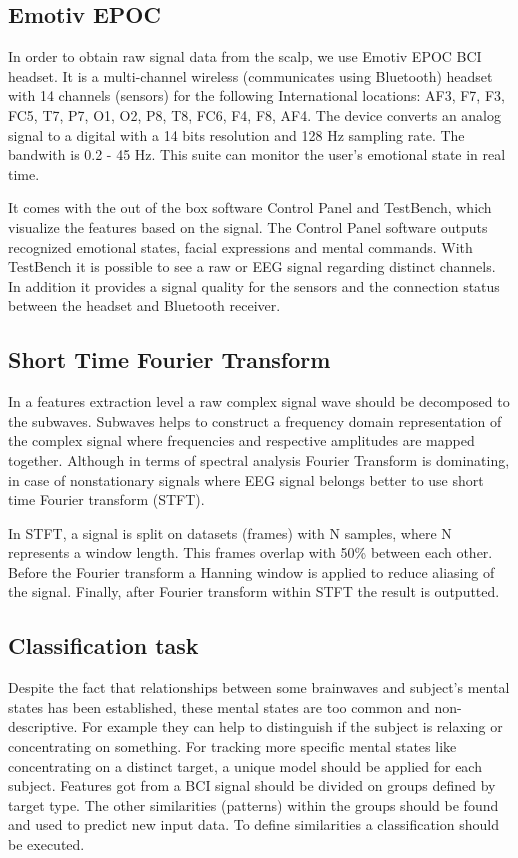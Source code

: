 \documentclass[12pt]{article}
\begin{document}
\subsection{Emotiv EPOC}

In order to obtain raw signal data from the scalp, we use Emotiv EPOC BCI headset. It is a multi-channel wireless (communicates using Bluetooth) headset with 14 channels (sensors) for the following International locations: AF3, F7, F3, FC5, T7, P7, O1, O2, P8, T8, FC6, F4, F8, AF4. The device converts an analog signal to a digital with a 14 bits resolution and 128 Hz sampling rate. The bandwith is 0.2 - 45 Hz. This suite can monitor the user's emotional state in real time.\cite{emotiv}

It comes with the out of the box software Control Panel and TestBench, which visualize the features based on the signal. The Control Panel software outputs recognized emotional states, facial expressions and mental commands. With TestBench it is possible to see a raw or EEG signal regarding distinct channels. In addition it provides a signal quality for the sensors and the connection status between the headset and Bluetooth receiver.
\subsection{Short Time Fourier Transform}

In a features extraction level a raw complex signal wave should be decomposed to the subwaves. Subwaves helps to construct a frequency domain representation of the complex signal where frequencies and respective amplitudes are mapped together. Although in terms of spectral analysis Fourier Transform is dominating, in case of nonstationary signals where EEG signal belongs better to use short time Fourier transform (STFT).\cite{alfahoum_fft}

In STFT, a signal is split on datasets (frames) with N samples, where N represents a window length. This frames overlap with 50\% between each other. Before the Fourier transform a Hanning window is applied to reduce aliasing of the signal. Finally, after Fourier transform within STFT the result is outputted.

\subsection{Classification task}

Despite the fact that relationships between some brainwaves and subject's mental states has been established, these mental states are too common and non-descriptive. For example they can help to distinguish if the subject is relaxing or concentrating on something. For tracking more specific mental states like concentrating on a distinct target, a unique model should be applied for each subject. Features got from a BCI signal should be divided on groups defined by target type. The other similarities (patterns) within the groups should be found and used to predict new input data. To define similarities a classification should be executed.
\end{document}
